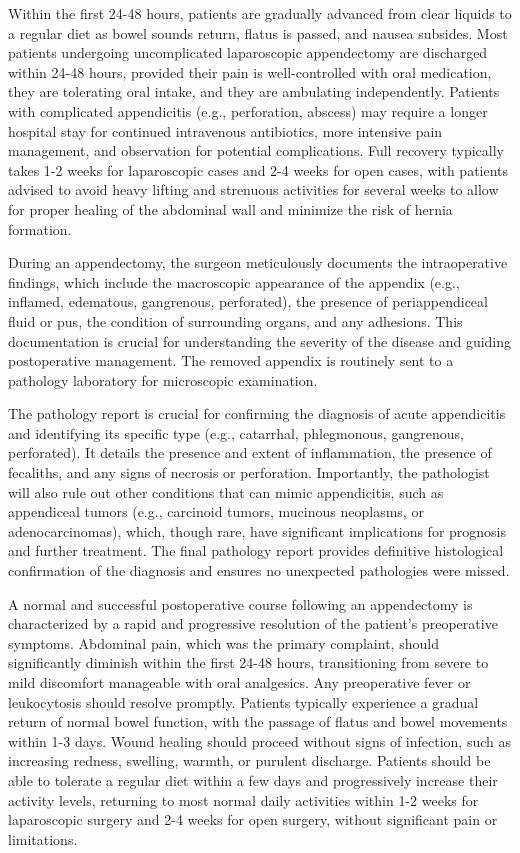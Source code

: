 Within the first 24-48 hours, patients are gradually advanced from clear liquids to a regular diet as bowel sounds return, flatus is passed, and nausea subsides. Most patients undergoing uncomplicated laparoscopic appendectomy are discharged within 24-48 hours, provided their pain is well-controlled with oral medication, they are tolerating oral intake, and they are ambulating independently. Patients with complicated appendicitis (e.g., perforation, abscess) may require a longer hospital stay for continued intravenous antibiotics, more intensive pain management, and observation for potential complications. Full recovery typically takes 1-2 weeks for laparoscopic cases and 2-4 weeks for open cases, with patients advised to avoid heavy lifting and strenuous activities for several weeks to allow for proper healing of the abdominal wall and minimize the risk of hernia formation.

During an appendectomy, the surgeon meticulously documents the intraoperative findings, which include the macroscopic appearance of the appendix (e.g., inflamed, edematous, gangrenous, perforated), the presence of periappendiceal fluid or pus, the condition of surrounding organs, and any adhesions. This documentation is crucial for understanding the severity of the disease and guiding postoperative management. The removed appendix is routinely sent to a pathology laboratory for microscopic examination.

The pathology report is crucial for confirming the diagnosis of acute appendicitis and identifying its specific type (e.g., catarrhal, phlegmonous, gangrenous, perforated). It details the presence and extent of inflammation, the presence of fecaliths, and any signs of necrosis or perforation. Importantly, the pathologist will also rule out other conditions that can mimic appendicitis, such as appendiceal tumors (e.g., carcinoid tumors, mucinous neoplasms, or adenocarcinomas), which, though rare, have significant implications for prognosis and further treatment. The final pathology report provides definitive histological confirmation of the diagnosis and ensures no unexpected pathologies were missed.

A normal and successful postoperative course following an appendectomy is characterized by a rapid and progressive resolution of the patient's preoperative symptoms. Abdominal pain, which was the primary complaint, should significantly diminish within the first 24-48 hours, transitioning from severe to mild discomfort manageable with oral analgesics. Any preoperative fever or leukocytosis should resolve promptly. Patients typically experience a gradual return of normal bowel function, with the passage of flatus and bowel movements within 1-3 days. Wound healing should proceed without signs of infection, such as increasing redness, swelling, warmth, or purulent discharge. Patients should be able to tolerate a regular diet within a few days and progressively increase their activity levels, returning to most normal daily activities within 1-2 weeks for laparoscopic surgery and 2-4 weeks for open surgery, without significant pain or limitations.

